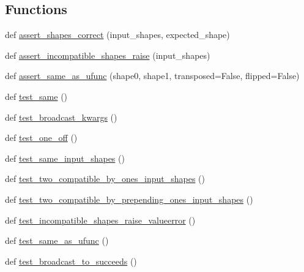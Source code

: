 \subsection*{Functions}
\begin{DoxyCompactItemize}
\item 
def \hyperlink{namespacenumpy_1_1lib_1_1tests_1_1test__stride__tricks_a134cbf60f3ab6d34a57c7dbb70d438d5}{assert\+\_\+shapes\+\_\+correct} (input\+\_\+shapes, expected\+\_\+shape)
\item 
def \hyperlink{namespacenumpy_1_1lib_1_1tests_1_1test__stride__tricks_a4c3f6a681077d4f340252dee4dc4aeb6}{assert\+\_\+incompatible\+\_\+shapes\+\_\+raise} (input\+\_\+shapes)
\item 
def \hyperlink{namespacenumpy_1_1lib_1_1tests_1_1test__stride__tricks_aa92d78ec0f4a76d51c73b0e6a22f85a7}{assert\+\_\+same\+\_\+as\+\_\+ufunc} (shape0, shape1, transposed=False, flipped=False)
\item 
def \hyperlink{namespacenumpy_1_1lib_1_1tests_1_1test__stride__tricks_a830b481b02455574a77cfabba3533f45}{test\+\_\+same} ()
\item 
def \hyperlink{namespacenumpy_1_1lib_1_1tests_1_1test__stride__tricks_a50e0f01739b861d2d092fa72b61b5ee8}{test\+\_\+broadcast\+\_\+kwargs} ()
\item 
def \hyperlink{namespacenumpy_1_1lib_1_1tests_1_1test__stride__tricks_a66a593d76153b7833575cf6bd71a7d9c}{test\+\_\+one\+\_\+off} ()
\item 
def \hyperlink{namespacenumpy_1_1lib_1_1tests_1_1test__stride__tricks_a50a62482ee006d99bda85266896e1857}{test\+\_\+same\+\_\+input\+\_\+shapes} ()
\item 
def \hyperlink{namespacenumpy_1_1lib_1_1tests_1_1test__stride__tricks_a84fdcfb63f5eb7f5a3a70f0e46d5ac9c}{test\+\_\+two\+\_\+compatible\+\_\+by\+\_\+ones\+\_\+input\+\_\+shapes} ()
\item 
def \hyperlink{namespacenumpy_1_1lib_1_1tests_1_1test__stride__tricks_a43c9d7d67eef95f3a99c43869ed0a6ec}{test\+\_\+two\+\_\+compatible\+\_\+by\+\_\+prepending\+\_\+ones\+\_\+input\+\_\+shapes} ()
\item 
def \hyperlink{namespacenumpy_1_1lib_1_1tests_1_1test__stride__tricks_a3c546cbffe3e814f9042c4963c2d0881}{test\+\_\+incompatible\+\_\+shapes\+\_\+raise\+\_\+valueerror} ()
\item 
def \hyperlink{namespacenumpy_1_1lib_1_1tests_1_1test__stride__tricks_a79dc125cb4a8c8b5643102ce5cf2904f}{test\+\_\+same\+\_\+as\+\_\+ufunc} ()
\item 
def \hyperlink{namespacenumpy_1_1lib_1_1tests_1_1test__stride__tricks_a49db805c9846b629f282e0470d53861a}{test\+\_\+broadcast\+\_\+to\+\_\+succeeds} ()

\end{DoxyCompactItemize}
